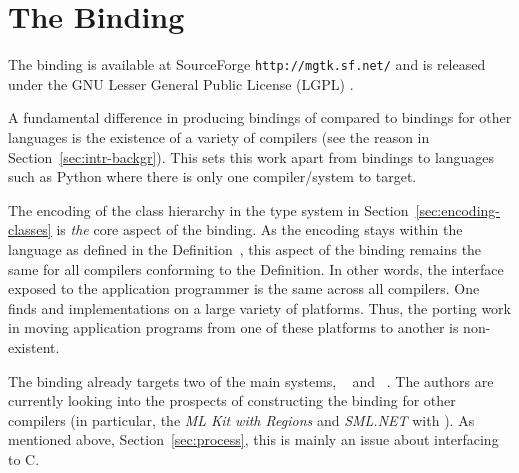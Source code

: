 \documentclass[workingdraft]{usetex-v1}
\begin{document}





\section{The \mgtk Binding}
\label{sec:mgtk-binding}

The \mgtk binding is available at SourceForge \texttt{http://mgtk.sf.net/}
and is released under the GNU Lesser General Public License
(LGPL) \cite{LGPL:1999}.

A fundamental difference in producing \sml bindings of \gtk compared
to bindings for other languages is the existence of a variety of
compilers (see the reason in Section~\ref{sec:intr-backgr}). This sets
this work apart from bindings to languages such as Python where
there is only one compiler/system to target. 

The encoding of the \gtk class hierarchy in the \sml type system in
Section~\ref{sec:encoding-classes} is \emph{the} core aspect of the
binding. As the encoding stays within the language as defined in the
Definition~\cite{Milner:1997:Definition}, this aspect of the binding
remains the same for all \sml compilers conforming to the Definition.
In other words, the interface exposed to the application programmer is
the same across all compilers.
%
One finds \sml and \gtk implementations on a large variety of
platforms. Thus, the porting work in moving application programs from one of these
platforms to another is non-existent.

The \mgtk binding already targets two of the main \sml systems,
\mosml~\cite{Mosml-webpage:2003} and \mlton~\cite{MLton-webpage:2003}.
The authors are currently looking into the prospects of constructing
the binding for other \sml compilers (in particular, the \emph{ML Kit
  with Regions} \cite{MLKit-webpage:2003} and \emph{SML.NET}
\cite{SML.NET-webpage:2003} with \gtksharp). As mentioned above,
Section~\ref{sec:process}, this is mainly an issue about interfacing
to C.
\end{document}
